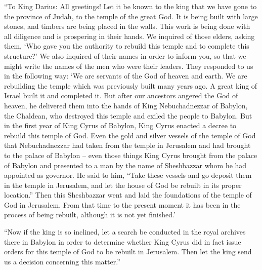 {\par }{\PP “To King
Darius: All
greetings!
Let it be
known
to the king
that
we have gone to
the province
of Judah,
to the temple
of the great
God.
It is
being built
with large
stones,
and timbers
are being placed
in the walls.
This
work
is being done
with all diligence
and is prospering
in their hands.
We inquired
of those
elders,
asking
them, ‘Who
gave
you the authority
to rebuild
this
temple
and to complete
this
structure?’
We also
inquired
of their names
in order to inform
you, so that
we might write
the names
of the men
who
were their leaders.
They responded
to us in the following
way: ‘We
are
servants
of the God
of heaven
and earth.
We are rebuilding
the temple
which
was
previously built
many
years
ago.
A great
king
of Israel
built
it and completed it.
But
after
our ancestors
angered
the God
of heaven,
he delivered
them
into the hands
of King
Nebuchadnezzar
of Babylon,
the Chaldean,
who destroyed
this
temple
and exiled
the people
to Babylon.
But
in the first
year
of King
Cyrus
of Babylon,
King
Cyrus
enacted
a decree
to rebuild
this
temple
of God.
Even
the gold
and silver
vessels
of the temple
of God
that
Nebuchadnezzar
had taken
from
the temple
in Jerusalem
and had brought
to the palace
of Babylon
– even those things
King
Cyrus
brought
from
the palace
of Babylon
and presented
to a man by the name
of Sheshbazzar
whom
he had appointed
as governor.
He said
to him, “Take
these
vessels
and go
deposit
them
in the temple
in Jerusalem,
and let the house
of God
be rebuilt
in
its proper location.”
Then
this
Sheshbazzar
went
and laid
the foundations
of the temple
of God
in Jerusalem.
From that
time
to
the present moment
it has been in the process of being rebuilt,
although it is not
yet finished.’
\par }{\PP {}“Now
if
the king
is so inclined,
let a search be conducted
in the royal
archives
there
in Babylon
in order
to determine
whether
King
Cyrus
did in fact issue
orders
for this
temple
of God
to be rebuilt
in Jerusalem.
Then let the king
send
us a decision
concerning
this matter.”

}
